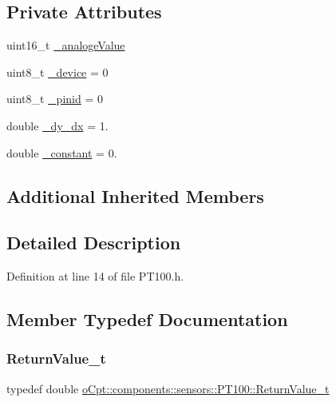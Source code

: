 \subsection*{Private Attributes}
\begin{DoxyCompactItemize}
\item 
uint16\+\_\+t \hyperlink{classo_cpt_1_1components_1_1sensors_1_1_p_t100_aeb98d92a8864ca202bcc7f382a6053c0}{\+\_\+analoge\+Value}
\item 
uint8\+\_\+t \hyperlink{classo_cpt_1_1components_1_1sensors_1_1_p_t100_af67b953bcfc2a50b211a36a6df5f311c}{\+\_\+device} = 0
\item 
uint8\+\_\+t \hyperlink{classo_cpt_1_1components_1_1sensors_1_1_p_t100_ac49f21dd8a8f2c7cd7e377512f5e9b25}{\+\_\+pinid} = 0
\item 
double \hyperlink{classo_cpt_1_1components_1_1sensors_1_1_p_t100_a3576ceab93d9cedce804469f72087155}{\+\_\+dy\+\_\+dx} = 1.
\item 
double \hyperlink{classo_cpt_1_1components_1_1sensors_1_1_p_t100_a9a38493994b9ec216a5a0d29f3c31cc3}{\+\_\+constant} = 0.
\end{DoxyCompactItemize}
\subsection*{Additional Inherited Members}


\subsection{Detailed Description}


Definition at line 14 of file P\+T100.\+h.



\subsection{Member Typedef Documentation}
\hypertarget{classo_cpt_1_1components_1_1sensors_1_1_p_t100_a385f85603cfd23bf76488f6b67e9fe2d}{}\label{classo_cpt_1_1components_1_1sensors_1_1_p_t100_a385f85603cfd23bf76488f6b67e9fe2d} 
\subsubsection{\texorpdfstring{Return\+Value\+\_\+t}{ReturnValue\_t}}
{\footnotesize\ttfamily typedef double \hyperlink{classo_cpt_1_1components_1_1sensors_1_1_p_t100_a385f85603cfd23bf76488f6b67e9fe2d}{o\+Cpt\+::components\+::sensors\+::\+P\+T100\+::\+Return\+Value\+\_\+t}}



